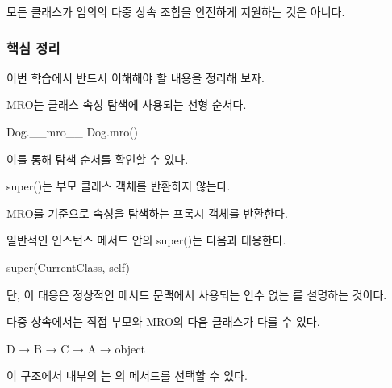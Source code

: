 모든 클래스가 임의의 다중 상속 조합을 안전하게 지원하는 것은 아니다.

\subsubsection{핵심 정리}

이번 학습에서 반드시 이해해야 할 내용을 정리해 보자.

\begin{dhknote}
\begin{dhksmry}[centered]
MRO는 클래스 속성 탐색에 사용되는 선형 순서다.
\end{dhksmry}
\end{dhknote}

\begin{dhkcode}
Dog.__mro__
Dog.mro()
\end{dhkcode}

이를 통해 탐색 순서를 확인할 수 있다.

\begin{dhknote}
\begin{dhksmry}[centered]
super()는 부모 클래스 객체를 반환하지 않는다.
\end{dhksmry}
\end{dhknote}

MRO를 기준으로 속성을 탐색하는  프록시 객체를 반환한다.

\begin{dhknote}
\begin{dhksmry}[centered]
일반적인 인스턴스 메서드 안의 super()는 다음과 대응한다.
\end{dhksmry}
\end{dhknote}

\begin{dhkcode}
super(CurrentClass, self)
\end{dhkcode}

단, 이 대응은 정상적인 메서드 문맥에서 사용되는 인수 없는 를 설명하는 것이다.

\begin{dhknote}
\begin{dhksmry}[centered]
다중 상속에서는 직접 부모와 MRO의 다음 클래스가 다를 수 있다.
\end{dhksmry}
\end{dhknote}

\begin{dhkzsh}
D → B → C → A → object
\end{dhkzsh}

이 구조에서  내부의 는 의 메서드를 선택할 수 있다.

